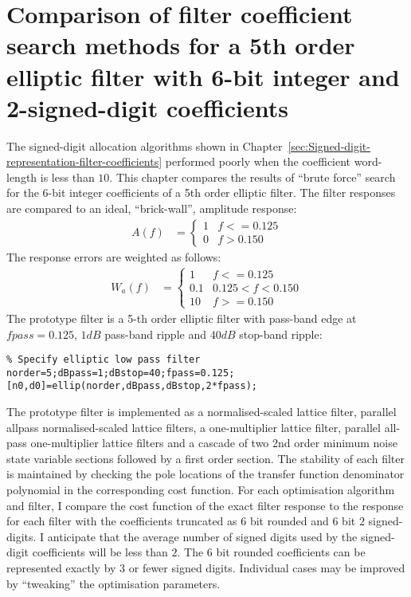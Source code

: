 \documentclass[a4paper,twoside,10pt,english]{report}
\begin{document}
\clearpage
\chapter{\label{sec:Comparison-filter-search-fifth-order-elliptic-filter}Comparison of filter coefficient search methods for a 5th order elliptic filter with 6-bit integer and 2-signed-digit  coefficients}
The signed-digit allocation algorithms shown in 
Chapter~\ref{sec:Signed-digit-representation-filter-coefficients} performed
poorly when the coefficient word-length is less than $10$. This chapter compares
the results of ``brute force'' search for the 6-bit integer coefficients of a 
5th order elliptic filter. The filter responses are compared to an ideal, 
``brick-wall'', amplitude response:
\begin{align*}
A\left(f\right) & = \begin{cases}
1 & f<=0.125\\
0 & f>0.150
\end{cases}
\end{align*}
The response errors are weighted as follows:
\begin{align*}
W_{a}\left(f\right) & = \begin{cases}
1 & f<=0.125\\
0.1 & 0.125<f<0.150\\
10 & f>=0.150
\end{cases}
\end{align*}
The prototype filter is a 5-th order elliptic filter with pass-band edge at
$fpass=0.125$, $1dB$ pass-band ripple and $40dB$ stop-band ripple:
\begin{small}
\begin{verbatim}
% Specify elliptic low pass filter
norder=5;dBpass=1;dBstop=40;fpass=0.125;
[n0,d0]=ellip(norder,dBpass,dBstop,2*fpass);
\end{verbatim}
\end{small}
The prototype filter is implemented as a normalised-scaled lattice filter,
parallel allpass normalised-scaled lattice filters, a one-multiplier lattice
filter, parallel all-pass one-multiplier lattice filters and a cascade of two
2nd order minimum noise state variable sections followed by a first order
section. The stability of each filter is maintained by checking the 
pole locations of the transfer function denominator polynomial in the
corresponding cost function. For each optimisation algorithm and filter, I 
compare the cost function of the exact filter response to the response for each
filter with the coefficients truncated as $6$ bit rounded and $6$ bit 
$2$ signed-digits. I anticipate that the average number of signed digits used
by the signed-digit coefficients will be less than $2$. The $6$ bit rounded 
coefficients can be represented exactly by $3$ or fewer signed digits. 
Individual cases may be improved by ``tweaking'' the optimisation 
parameters.
\end{document}
